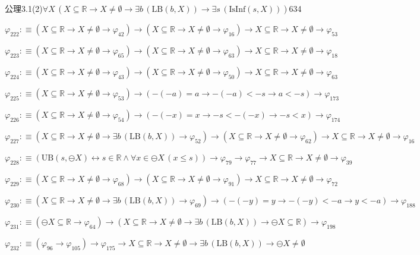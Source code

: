 \begin{fullproof}{公理3.1(2)}{$\forall X\,(X \subseteq \mathbb{R} \to X \neq \emptyset \to \exists b\,(\mathrm{LB}(b,X)) \to \exists s\,(\mathrm{IsInf}(s,X)))$}{634}
\begin{abbrevlist}
\item $\varphi_{222} :\equiv (X \subseteq \mathbb{R} \to X \neq \emptyset \to \varphi_{42}) \to (X \subseteq \mathbb{R} \to X \neq \emptyset \to \varphi_{16}) \to X \subseteq \mathbb{R} \to X \neq \emptyset \to \varphi_{53}$
\item $\varphi_{223} :\equiv (X \subseteq \mathbb{R} \to X \neq \emptyset \to \varphi_{65}) \to (X \subseteq \mathbb{R} \to X \neq \emptyset \to \varphi_{63}) \to X \subseteq \mathbb{R} \to X \neq \emptyset \to \varphi_{18}$
\item $\varphi_{224} :\equiv (X \subseteq \mathbb{R} \to X \neq \emptyset \to \varphi_{43}) \to (X \subseteq \mathbb{R} \to X \neq \emptyset \to \varphi_{50}) \to X \subseteq \mathbb{R} \to X \neq \emptyset \to \varphi_{63}$
\item $\varphi_{225} :\equiv (X \subseteq \mathbb{R} \to X \neq \emptyset \to \varphi_{53}) \to (-(-a) = a \to -(-a) < -s \to a < -s) \to \varphi_{173}$
\item $\varphi_{226} :\equiv (X \subseteq \mathbb{R} \to X \neq \emptyset \to \varphi_{54}) \to (-(-x) = x \to -s < -(-x) \to -s < x) \to \varphi_{174}$
\item $\varphi_{227} :\equiv (X \subseteq \mathbb{R} \to X \neq \emptyset \to \exists b\,(\mathrm{LB}(b,X)) \to \varphi_{52}) \to (X \subseteq \mathbb{R} \to X \neq \emptyset \to \varphi_{62}) \to X \subseteq \mathbb{R} \to X \neq \emptyset \to \varphi_{16}$
\item $\varphi_{228} :\equiv (\mathrm{UB}(s,\ominus X) \leftrightarrow s \in \mathbb{R} \land \forall x \in \ominus X\,(x \leq s)) \to \varphi_{79} \to \varphi_{77} \to X \subseteq \mathbb{R} \to X \neq \emptyset \to \varphi_{39}$
\item $\varphi_{229} :\equiv (X \subseteq \mathbb{R} \to X \neq \emptyset \to \varphi_{68}) \to (X \subseteq \mathbb{R} \to X \neq \emptyset \to \varphi_{91}) \to X \subseteq \mathbb{R} \to X \neq \emptyset \to \varphi_{72}$
\item $\varphi_{230} :\equiv (X \subseteq \mathbb{R} \to X \neq \emptyset \to \exists b\,(\mathrm{LB}(b,X)) \to \varphi_{69}) \to (-(-y) = y \to -(-y) < -a \to y < -a) \to \varphi_{188}$
\item $\varphi_{231} :\equiv (\ominus X \subseteq \mathbb{R} \to \varphi_{64}) \to (X \subseteq \mathbb{R} \to X \neq \emptyset \to \exists b\,(\mathrm{LB}(b,X)) \to \ominus X \subseteq \mathbb{R}) \to \varphi_{198}$
\item $\varphi_{232} :\equiv (\varphi_{96} \to \varphi_{105}) \to \varphi_{175} \to X \subseteq \mathbb{R} \to X \neq \emptyset \to \exists b\,(\mathrm{LB}(b,X)) \to \ominus X \neq \emptyset$

\end{abbrevlist}
\end{fullproof}

